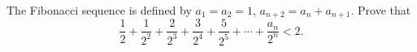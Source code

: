 The Fibonacci sequence is defined by $a_1 = a_2 = 1$, $a_{n+2} = a_n + a_{n+1}$. Prove that
\[ \frac{1}{2} + \frac{1}{2^2} + \frac{2}{2^3} + \frac{3}{2^4} + \frac{5}{2^5} + \cdots + \frac{a_n}{2^n} < 2. \]
